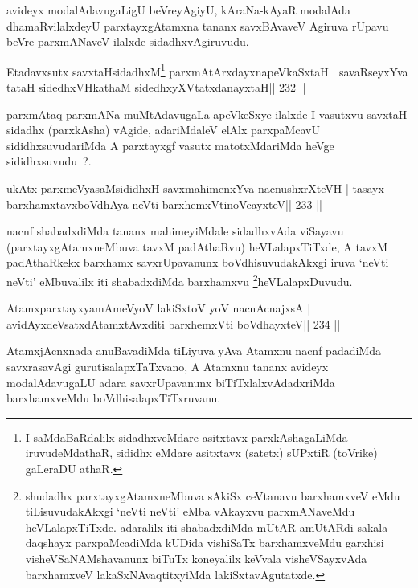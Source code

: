 \begin{artha}
avideyx modalAdavugaLigU beVreyAgiyU, kAraNa-kAyaR modalAda dhamaRvilalxdeyU parxtayxgAtamxna tananx savxBAvaveV Agiruva rUpavu beVre parxmANaveV ilalxde sidadhxvAgiruvudu.
\end{artha}

\begin{shl}
Etadavxsutx savxtaHsidadhxM\footnote{I saMdaBaRdalilx sidadhxveMdare asitxtavx-parxkAshagaLiMda iruvudeMdathaR, sididhx eMdare asitxtavx (satetx) sUPxtiR (toVrike) gaLeraDU athaR.} parxmAtArxdayxnapeVkaSxtaH |
savaRseyxYva tataH sidedhxVH\footnotemark[\value{footnote}] kathaM sidedhxyXVtatxdanayxtaH\hfill || 232 ||
\end{shl}

\begin{artha}
parxmAtaq parxmANa muMtAdavugaLa apeVkeSxye ilalxde I vasutxvu savxtaH sidadhx (parxkAsha) vAgide, adariMdaleV elAlx parxpaMcavU sididhxsuvudariMda A parxtayxgf vasutx matotxMdariMda heVge sididhxsuvudu~?.
\end{artha}

\begin{shl}
ukAtx parxmeVyasaMsididhxH savxmahimenxYva nacnushxrXteVH |
tasayx barxhamxtavxboVdhAya neVti barxhemxVtinoVcayxteV\hfill || 233 ||
\end{shl}

\begin{artha}
nacnf shabadxdiMda tananx mahimeyiMdale sidadhxvAda viSayavu
(parxtayxgAtamxneMbuva tavxM padAthaRvu) heVLalapxTiTxde, A
tavxM padAthaRkekx barxhamx savxrUpavanunx boVdhisuvudakAkxgi iruva
`neVti neVti' eMbuvalilx iti shabadxdiMda
barxhamxvu \footnote{shudadhx parxtayxgAtamxneMbuva sAkiSx
  ceVtanavu barxhamxveV eMdu tiLisuvudakAkxgi `neVti neVti' eMba
  vAkayxvu parxmANaveMdu heVLalapxTiTxde. adaralilx iti shabadxdiMda
  mUtAR amUtARdi sakala daqshayx parxpaMcadiMda kUDida vishiSaTx
  barxhamxveMdu garxhisi visheVSaNAMshavanunx biTuTx koneyalilx
  keVvala visheVSayxvAda barxhamxveV lakaSxNAvaqtitxyiMda lakiSxtavAgutatxde.}heVLalapxDuvudu.
\end{artha}

\begin{shl}
AtamxparxtayxyamAmeVyoV lakiSxtoV yoV nacnA\s cnajxsA |
avidAyxdeVsatxdAtamxtAvxditi barxhemxVti boVdhayxteV\hfill || 234 ||
\end{shl}

\begin{artha}
AtamxjAcnxnada anuBavadiMda tiLiyuva yAva Atamxnu nacnf padadiMda savxrasavAgi gurutisalapxTaTxvano, A Atamxnu tananx avideyx modalAdavugaLU adara savxrUpavanunx biTiTxlalxvAdadxriMda barxhamxveMdu boVdhisalapxTiTxruvanu.
\end{artha}

